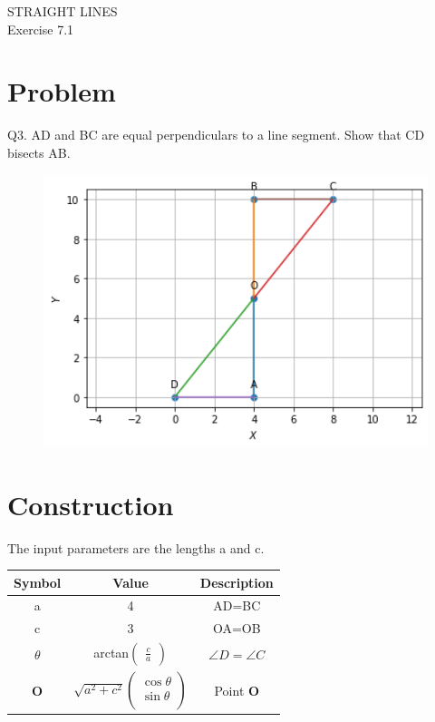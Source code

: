 \documentclass[10pt,a4paper]{article}
\title{\mytitle}
\newcommand{\myvec}[1]{\ensuremath{\begin{pmatrix}#1\end{pmatrix}}}
\let\vec\mathbf
\begin{document}
\begin{center}
\textbf\large{ STRAIGHT LINES}\\
\textbf\large{Exercise 7.1}
\end{center}

\tableofcontents
\section{Problem}
Q3. AD and BC are equal perpendiculars to a line segment. Show that CD bisects AB.
\begin{figure}[!h]
	\begin{center}
		\includegraphics[width=5in]{./figs/figure.png}
	\end{center}
\caption{}
\label{figure}
\end{figure}
\pagebreak
\section{Construction}
The input parameters are the lengths a and c.\\
{
\setlength\extrarowheight{2pt}
\begin{tabular}{|c|c|c|}
	\hline
	\textbf{Symbol}&\textbf{Value}&\textbf{Description}\\
	\hline
	a&4&AD=BC\\
	\hline
	c&3&OA=OB\\
	\hline
	$\theta$&arctan$\myvec{\frac{c}{a}}$&$\angle{D}=\angle{C}$\\
	\hline
	$\vec{O}$&$\sqrt{a^2+c^2}%
	\begin{pmatrix}
		\cos\theta\\
		\sin\theta\\
	\end{pmatrix}$%
	&Point $\vec{O}$\\
	\hline
\end{tabular}
}
\end{document}
